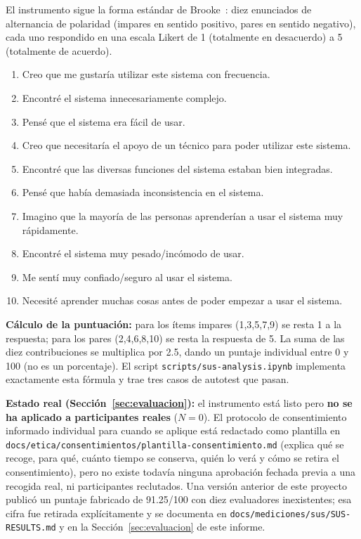 El instrumento sigue la forma estándar de Brooke~\cite{brooke1996}: diez enunciados de alternancia de
polaridad (impares en sentido positivo, pares en sentido negativo), cada uno respondido en una escala
Likert de 1 (totalmente en desacuerdo) a 5 (totalmente de acuerdo).

\begin{enumerate}[nosep]
    \item Creo que me gustaría utilizar este sistema con frecuencia.
    \item Encontré el sistema innecesariamente complejo.
    \item Pensé que el sistema era fácil de usar.
    \item Creo que necesitaría el apoyo de un técnico para poder utilizar este sistema.
    \item Encontré que las diversas funciones del sistema estaban bien integradas.
    \item Pensé que había demasiada inconsistencia en el sistema.
    \item Imagino que la mayoría de las personas aprenderían a usar el sistema muy rápidamente.
    \item Encontré el sistema muy pesado/incómodo de usar.
    \item Me sentí muy confiado/seguro al usar el sistema.
    \item Necesité aprender muchas cosas antes de poder empezar a usar el sistema.
\end{enumerate}

\textbf{Cálculo de la puntuación:} para los ítems impares (1,3,5,7,9) se resta 1 a la respuesta; para los
pares (2,4,6,8,10) se resta la respuesta de 5. La suma de las diez contribuciones se multiplica por 2.5,
dando un puntaje individual entre 0 y 100 (no es un porcentaje). El script
\texttt{scripts/sus-analysis.ipynb} implementa exactamente esta fórmula y trae tres casos de autotest que
pasan.

\textbf{Estado real (Sección~\ref{sec:evaluacion}):} el instrumento está listo pero \textbf{no se ha
aplicado a participantes reales} ($N=0$). El protocolo de consentimiento informado individual para cuando
se aplique está redactado como plantilla en \texttt{docs/etica/consentimientos/plantilla-consentimiento.md}
(explica qué se recoge, para qué, cuánto tiempo se conserva, quién lo verá y cómo se retira el
consentimiento), pero no existe todavía ninguna aprobación fechada previa a una recogida real, ni
participantes reclutados. Una versión anterior de este proyecto publicó un puntaje fabricado de
91.25/100 con diez evaluadores inexistentes; esa cifra fue retirada explícitamente y se documenta en
\texttt{docs/mediciones/sus/SUS-RESULTS.md} y en la Sección~\ref{sec:evaluacion} de este informe.

